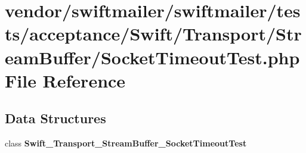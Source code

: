 \section{vendor/swiftmailer/swiftmailer/tests/acceptance/\+Swift/\+Transport/\+Stream\+Buffer/\+Socket\+Timeout\+Test.php File Reference}
\label{_socket_timeout_test_8php}
\subsection*{Data Structures}
\begin{DoxyCompactItemize}
\item 
class {\bf Swift\+\_\+\+Transport\+\_\+\+Stream\+Buffer\+\_\+\+Socket\+Timeout\+Test}
\end{DoxyCompactItemize}

